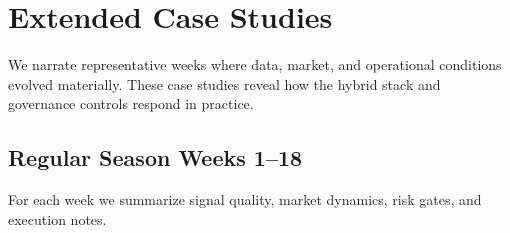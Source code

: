 \documentclass[12pt]{report}  %
\numberwithin{equation}{section}
\theoremstyle{plain}
\theoremstyle{definition}
\theoremstyle{remark}
\begin{document}

\chapter{Extended Case Studies}
We narrate representative weeks where data, market, and operational conditions evolved materially. These case studies reveal how the hybrid stack and governance controls respond in practice.

\section{Regular Season Weeks 1--18}
For each week we summarize signal quality, market dynamics, risk gates, and execution notes.
\end{document}
